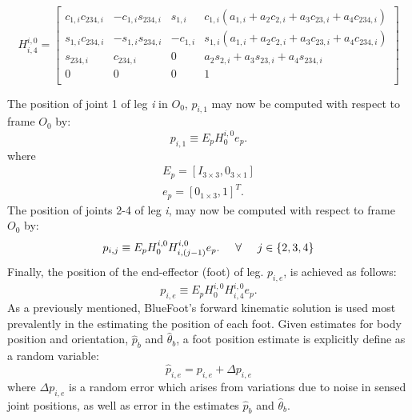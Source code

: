 				\begin{equation}
					H^{i,0}_{i,4} =\left[ 
					\begin{array}{ccc|c}
						c_{1,i} c_{234,i}	&  		-c_{1,i} s_{234,i}	& 		s_{1,i}		&		c_{1,i}( a_{1,i} + a_2 c_{2,i} + a_3 c_{23,i} + a_4 c_{234,i} )		\\
						s_{1,i} c_{234,i}	&  		-s_{1,i} s_{234,i}	& 		-c_{1,i}	&		s_{1,i}( a_{1,i} + a_2 c_{2,i} + a_3 c_{23,i} + a_4 c_{234,i} )		\\
						s_{234,i} 		&  		c_{234,i}		& 		0			&		a_2 s_{2,i} + a_3 s_{23,i} + a_4 s_{234,i}					\\ \hline
						0 			& 		0			& 		0			&		1 															\\
					\end{array} 
					\right]
				\end{equation}

			The position of joint 1 of leg \emph{i} in $O_{0}$, ${p}_{i,1}$ may now be computed with respect to frame $O_{0}$ by:
				\begin{equation}
					{p}_{i,1} \equiv E_{p} H_{0}^{i,0} e_{p}.
					\label{eq::world_joint1_position}
				\end{equation}
			where
				\begin{eqnarray}
					E_{p} = [I_{3\times3},0_{3\times1}]	\nonumber 	\\
					e_{p} = [0_{1\times3},1]^T.			\nonumber 	
				\end{eqnarray}
			The position of joints 2-4 of leg \emph{i}, may now be computed with respect to frame $O_{0}$ by:
				\begin{equation}
					{p}_{i,j} \equiv E_{p} H_{0}^{i,0} {H}^{i,0}_{i,(j-1)} e_{p}. \hspace{5mm} \forall \hspace{5mm} j\in\{2,3,4\}
					\label{eq::world_joint_positions}
				\end{equation}
			Finally, the position of the end-effector (foot) of \Ith leg. ${p}_{i,e}$, is achieved as follows:
				\begin{equation}
					{p}_{i,e} \equiv E_{p} H_{0}^{i,0} {H}^{i,0}_{i,4} e_{p}.
					\label{eq::world_feet_positions}
				\end{equation}
			As a previously mentioned, BlueFoot's forward kinematic solution is used most prevalently in the estimating the position of each foot. Given estimates for body position and orientation, $\hat{p}_{b}$ and $\hat{\theta}_{b}$, a foot position estimate is explicitly define as a random variable:
				\begin{equation}
					\hat{p}_{i,e} = {p}_{i,e} + \Delta {p}_{i,e}
					\label{eq::foot_position_esitmate}
				\end{equation}
			where $\Delta {p}_{i,e}$ is a random error which arises from variations due to noise in sensed joint positions, as well as error in the estimates $\hat{p}_{b}$ and $\hat{\theta}_{b}$.


